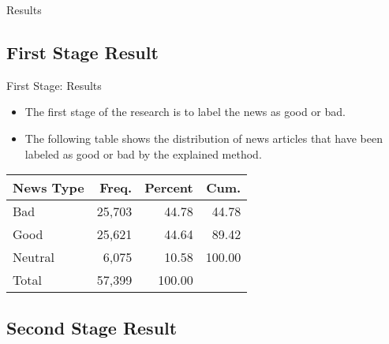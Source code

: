 \documentclass{beamer}
\begin{document}
\begin{frame}
    \Huge
    \center
    Results
\end{frame}


\subsection{First Stage Result}

\begin{frame}{First Stage: Results}

    \begin{itemize}
        \item The first stage of the research is to label the news as good or bad.
        \item The following table shows the distribution of news articles that have been labeled as good or bad by the explained method.
    \end{itemize}

    \center

    \begin{tabular}{lrrr}
        \toprule
        News Type & Freq.  & Percent & Cum.   \\
        \midrule
        Bad       & 25,703 & 44.78   & 44.78  \\
        Good      & 25,621 & 44.64   & 89.42  \\
        Neutral   & 6,075  & 10.58   & 100.00 \\
        \midrule
        Total     & 57,399 & 100.00  &        \\
        \bottomrule
    \end{tabular}


\end{frame}


\subsection{Second Stage Result}
\end{document}
